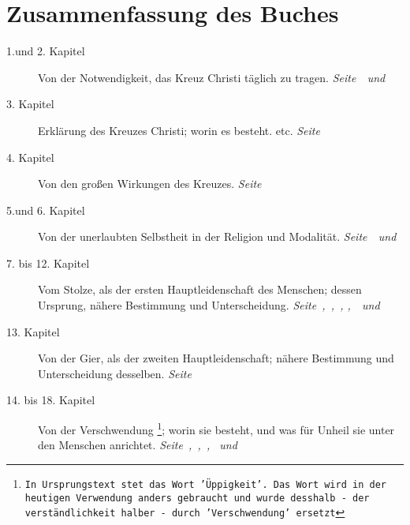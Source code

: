\documentclass[a5paper,pagesize,9pt]{scrbook}
\begin{document}
\chapter{Zusammenfassung des Buches}
\begin{description}
\item[1.und 2. Kapitel] Von der Notwendigkeit, das Kreuz Christi täglich zu
tragen.
\dotfill \textit{Seite~\pageref{kap1}~und~\pageref{kap2}}\\
\item[3. Kapitel] Erklärung des Kreuzes Christi; worin es besteht. etc.
\dotfill \textit{Seite~\pageref{kap3}}\\
\item[4. Kapitel] Von den großen Wirkungen des Kreuzes.
\dotfill \textit{Seite~\pageref{kap4}}\\
\item[5.und 6. Kapitel] Von der unerlaubten Selbstheit in der Religion und
Modalität.
\dotfill \textit{Seite~\pageref{kap5}~und~\pageref{kap6}}\\
\item[7. bis 12. Kapitel] Vom Stolze, als der ersten Hauptleidenschaft des
Menschen; dessen Ursprung, nähere Bestimmung und Unterscheidung.
\dotfill \textit{Seite~\pageref{kap7},~\pageref{kap8},~\pageref{kap9}, \pageref{kap10},~\pageref{kap11}~und~\pageref{kap12}}\\
\item[13. Kapitel] Von der Gier, als der zweiten Hauptleidenschaft; nähere
Bestimmung und Unterscheidung desselben.
\dotfill \textit{Seite~\pageref{kap13}}\\
\item[14. bis 18. Kapitel] Von der Verschwendung
\footnote{\texttt{In Ursprungstext stet
das Wort 'Üppigkeit'. Das Wort wird in der heutigen Verwendung anders
gebraucht und wurde desshalb - der verständlichkeit halber - durch
'Verschwendung' ersetzt}}; worin sie besteht, und was für Unheil sie unter den
Menschen anrichtet.
\dotfill \textit{Seite~\pageref{kap14},~\pageref{kap15},~\pageref{kap16},
\pageref{kap17}~und~\pageref{kap18}}\\
\end{description}

\end{document}
